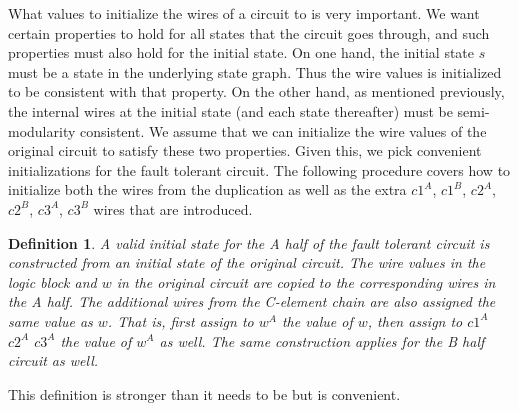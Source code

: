 \documentclass[12pt]{report}
\newtheorem*{definition}{Definition}
\begin{document}
What values to initialize the wires of a circuit to is very important.  We want certain properties to hold for all states that the circuit goes through, and such properties must also hold for the initial state.  On one hand, the initial state $s$ must be a state in the underlying state graph.  Thus the wire values is initialized to be consistent with that property.  On the other hand, as mentioned previously, the internal wires at the initial state (and each state thereafter) must be semi-modularity consistent.  We assume that we can initialize the wire values of the original circuit to satisfy these two properties.  Given this, we pick convenient initializations for the fault tolerant circuit.  The following procedure covers how to initialize both the wires from the duplication as well as the extra $c1^A$, $c1^B$, $c2^A$, $c2^B$, $c3^A$, $c3^B$ wires that are introduced.
\begin{definition} A {\em valid initial state} for the A half of the fault tolerant circuit is constructed from an initial state of the original circuit.  The wire values in the logic block and $w$ in the original circuit are copied to the corresponding wires in the A half.  The additional wires from the C-element chain are also assigned the same value as $w$.  That is, first assign to $w^A$ the value of $w$, then assign to $c1^A$ $c2^A$ $c3^A$ the value of $w^A$ as well. The same construction applies for the B half circuit as well.
\end{definition}
This definition is stronger than it needs to be but is convenient.\\

\end{document}
